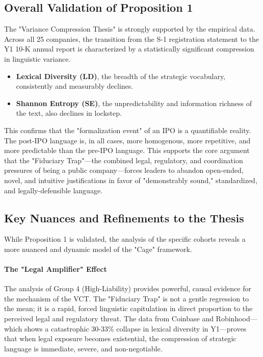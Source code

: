 \documentclass[12pt, letterpaper]{article}
\begin{document}
\subsection{Overall Validation of Proposition 1}
The "Variance Compression Thesis" is strongly supported by the empirical data. Across all 25 companies, the transition from the S-1 registration statement to the Y1 10-K annual report is characterized by a statistically significant compression in linguistic variance.
\begin{itemize}
    \item \textbf{Lexical Diversity (LD)}, the breadth of the strategic vocabulary, consistently and measurably declines.
    \item \textbf{Shannon Entropy (SE)}, the unpredictability and information richness of the text, also declines in lockstep.
\end{itemize}
This confirms that the "formalization event" of an IPO is a quantifiable reality. The post-IPO language is, in all cases, more homogenous, more repetitive, and more predictable than the pre-IPO language. This supports the core argument that the "Fiduciary Trap"—the combined legal, regulatory, and coordination pressures of being a public company—forces leaders to abandon open-ended, novel, and intuitive justifications in favor of "demonstrably sound," standardized, and legally-defensible language.

\subsection{Key Nuances and Refinements to the Thesis}
While Proposition 1 is validated, the analysis of the specific cohorts reveals a more nuanced and dynamic model of the "Cage" framework.

\paragraph{The "Legal Amplifier" Effect} The analysis of Group 4 (High-Liability) provides powerful, causal evidence for the mechanism of the VCT. The "Fiduciary Trap" is not a gentle regression to the mean; it is a rapid, forced linguistic capitulation in direct proportion to the perceived legal and regulatory threat. The data from Coinbase \cite{key57} and Robinhood—which shows a catastrophic 30-33\% collapse in lexical diversity in Y1—proves that when legal exposure becomes existential, the compression of strategic language is immediate, severe, and non-negotiable.
\end{document}
